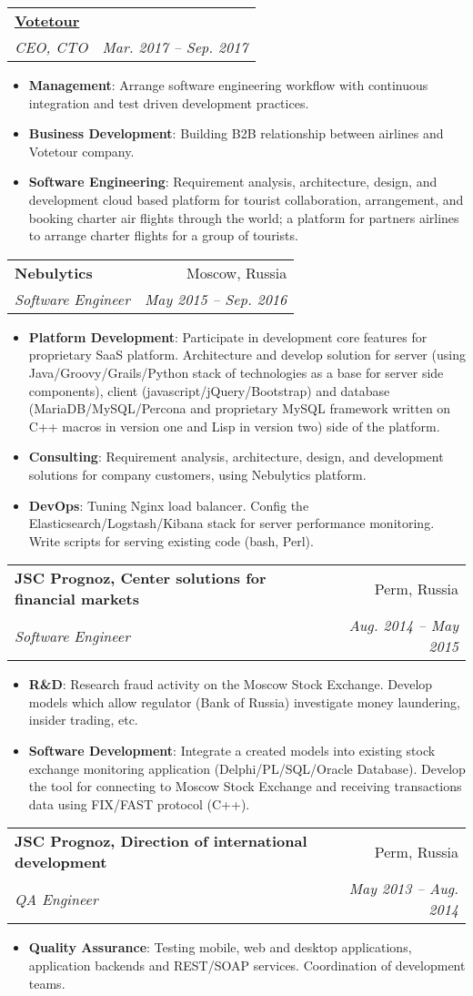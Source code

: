 \documentclass[letterpaper,11pt]{article}
\makeatletter
\newcommand{\resumeItem}[2]{
  \item\small{
    \textbf{#1}{: #2 \vspace{-2pt}}
  }
}
\newcommand{\resumeSubheading}[4]{
  \vspace{-1pt}\item
    \begin{tabular*}{0.97\textwidth}{l@{\extracolsep{\fill}}r}
      \textbf{#1} & #2 \\
      \textit{\small#3} & \textit{\small #4} \\
    \end{tabular*}\vspace{-5pt}
}
\newcommand{\resumeItemListStart}{\begin{itemize}}
\newcommand{\resumeItemListEnd}{\end{itemize}\vspace{-5pt}}
\makeatother
\begin{document}
    \resumeSubheading
      {\href{http://votetour.com}{Votetour}}{}
      {CEO, CTO}{Mar. 2017 -- Sep. 2017}
      \resumeItemListStart
        \resumeItem{Management}
          {Arrange software engineering workflow with continuous integration and test driven development practices.}
        \resumeItem{Business Development}
          {Building B2B relationship between airlines and Votetour company.}
        \resumeItem{Software Engineering}
          {Requirement analysis, architecture, design, and development cloud based platform for tourist collaboration, arrangement, and booking charter air flights through the world; a platform for partners airlines to arrange charter flights for a group of tourists.}
    \resumeItemListEnd


    \resumeSubheading
      {Nebulytics}{Moscow, Russia}
      {Software Engineer}{May 2015 -- Sep. 2016}
      \resumeItemListStart
        \resumeItem{Platform Development}
          {Participate in development core features for proprietary SaaS platform. Architecture and develop solution for server (using Java/Groovy/Grails/Python stack of technologies as a base for server side components), client (javascript/jQuery/Bootstrap) and database (MariaDB/MySQL/Percona and proprietary MySQL framework written on C++ macros in version one and Lisp in version two) side of the platform.}
        \resumeItem{Consulting}
          {Requirement analysis, architecture, design, and development solutions for company customers, using Nebulytics platform.}
        \resumeItem{DevOps}
          {Tuning Nginx load balancer. Config the Elasticsearch/Logstash/Kibana stack for server performance monitoring. Write scripts for serving existing code (bash, Perl).}
      \resumeItemListEnd

    \resumeSubheading
      {JSC Prognoz, Center solutions for financial markets}{Perm, Russia}
      {Software Engineer}{Aug. 2014 -- May 2015}
      \resumeItemListStart
        \resumeItem{R\&D}
          {Research fraud activity on the Moscow Stock Exchange. Develop models which allow regulator (Bank of Russia) investigate money laundering, insider trading, etc.}
        \resumeItem{Software Development}
          {Integrate a created models into existing stock exchange monitoring application (Delphi/PL/SQL/Oracle Database). Develop the tool for connecting to Moscow Stock Exchange and receiving transactions data using FIX/FAST protocol (C++).}
      \resumeItemListEnd

    \resumeSubheading
      {JSC Prognoz, Direction of international development}{Perm, Russia}
      {QA Engineer}{May 2013 -- Aug. 2014}
      \resumeItemListStart
        \resumeItem{Quality Assurance}
          {Testing mobile, web and desktop applications, application backends and REST/SOAP services. Coordination of development teams.}
      \resumeItemListEnd
\end{document}
